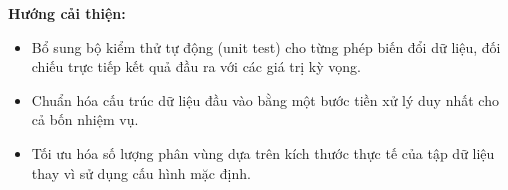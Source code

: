 \textbf{Hướng cải thiện:}
\begin{itemize}
    \item Bổ sung bộ kiểm thử tự động (unit test) cho từng phép biến đổi dữ liệu, đối chiếu trực tiếp kết quả đầu ra với các giá trị kỳ vọng.
    \item Chuẩn hóa cấu trúc dữ liệu đầu vào bằng một bước tiền xử lý duy nhất cho cả bốn nhiệm vụ.
    \item Tối ưu hóa số lượng phân vùng dựa trên kích thước thực tế của tập dữ liệu thay vì sử dụng cấu hình mặc định.
\end{itemize}
